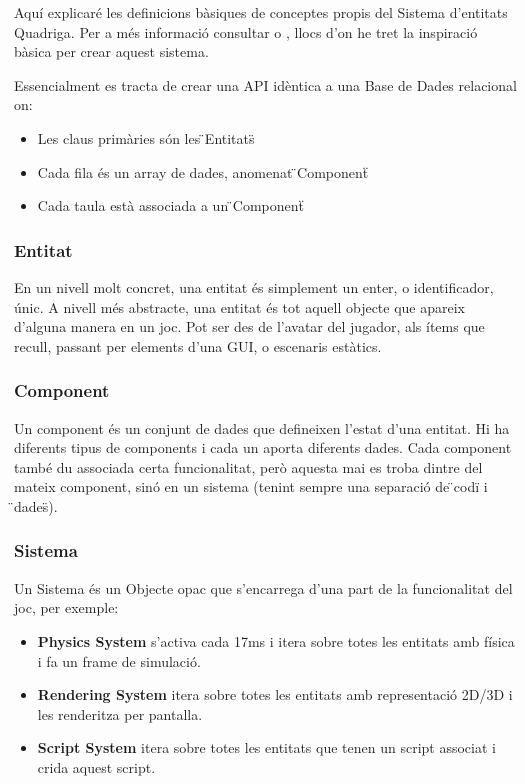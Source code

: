 Aquí explicaré les definicions bàsiques de conceptes propis del Sistema d'entitats Quadriga. Per a més informació consultar \cite{EntityWikiB} o \cite{Martin07}, llocs d'on he tret la inspiració bàsica per crear aquest sistema.

Essencialment es tracta de crear una API idèntica a una Base de Dades relacional on:

\begin{itemize}
  \item Les claus primàries són les \"{}Entitats\"{}
  \item Cada fila és un array de dades, anomenat \"{}Component\"{}
  \item Cada taula està associada a un \"{}Component\"{}
\end{itemize}

\subsubsection{Entitat}

En un nivell molt concret, una entitat és simplement un enter, o identificador, únic. A nivell més abstracte, una entitat és tot aquell objecte que apareix d'alguna manera en un joc. Pot ser des de l'avatar del jugador, als ítems que recull, passant per elements d'una GUI, o escenaris estàtics.

\subsubsection{Component}

Un component és un conjunt de dades que defineixen l'estat d'una entitat. Hi ha diferents tipus de components i cada un aporta diferents dades. Cada component també du associada certa funcionalitat, però aquesta mai es troba dintre del mateix component, sinó en un sistema (tenint sempre una separació de \"{}codi\"{} i \"{}dades\"{}).

\subsubsection{Sistema}

Un Sistema és un Objecte opac que s'encarrega d'una part de la funcionalitat del joc, per exemple:
\begin{itemize}
  \item{\bf Physics System} s'activa cada 17ms i itera sobre totes les entitats amb física i fa un frame de simulació.
  \item{\bf Rendering System} itera sobre totes les entitats amb representació 2D/3D i les renderitza per pantalla.
  \item{\bf Script System} itera sobre totes les entitats que tenen un script associat i crida aquest script.
\end{itemize}

